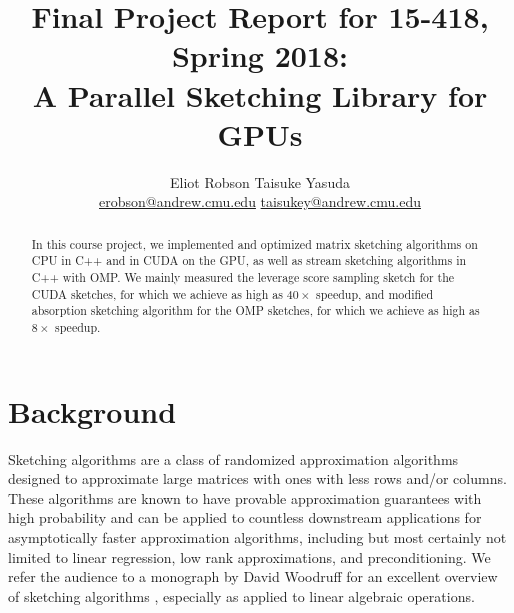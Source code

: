\documentclass[12pt]{article}
\begin{document}
\title{
    \normalsize Final Project Report for 15-418, Spring 2018: \\
    \LARGE A Parallel Sketching Library for GPUs
}
\author{Eliot Robson \qquad Taisuke Yasuda\\ \small
\href{mailto:erobson@andrew.cmu.edu}{erobson@andrew.cmu.edu} \quad \href{mailto:taisukey@andrew.cmu.edu}{taisukey@andrew.cmu.edu}}

\maketitle

\begin{abstract}
	In this course project, we implemented and optimized matrix sketching algorithms on CPU in C++ and in CUDA on the GPU, as well as stream sketching algorithms in C++ with OMP. We mainly measured the leverage score sampling sketch for the CUDA sketches, for which we achieve as high as $40\times$ speedup, and modified absorption sketching algorithm for the OMP sketches, for which we achieve as high as $8\times$ speedup.
\end{abstract}

\section{Background}
Sketching algorithms are a class of randomized approximation algorithms designed to approximate large matrices with ones with less rows and/or columns. These algorithms are known to have provable approximation guarantees with high probability and can be applied to countless downstream applications for asymptotically faster approximation algorithms, including but most certainly not limited to linear regression, low rank approximations, and preconditioning. We refer the audience to a monograph by David Woodruff for an excellent overview of sketching algorithms \cite{woodruff2014sketching}, especially as applied to linear algebraic operations.
\end{document}
